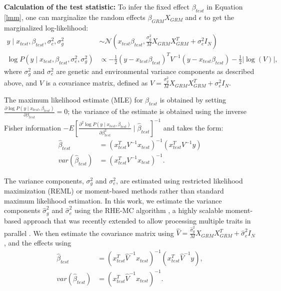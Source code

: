 \textbf{Calculation of the test statistic: }
%
To infer the fixed effect $\beta_{test}$ in Equation \ref{lmm}, one can marginalize the random effects $\beta_{GRM}X_{GRM}$ and $\epsilon$ to get the marginalized log-likelihood:
\begin{align}
    y \mid x_{test}, \beta_{test}, \sigma_e^2, \sigma_g^2 &\sim \mathcal{N}(x_{test}\beta_{test}, \frac{\sigma_g^2}{M} X_{GRM}X_{GRM}^T + \sigma_e^2 I_N) \nonumber \\
    \log P(y \mid x_{test}, \beta_{test}, \sigma_e^2, \sigma_g^2) &\propto -\frac{1}{2} (y-x_{test}\beta_{test})^TV^{-1}(y-x_{test}\beta_{test}) -\frac{1}{2} \lvert \log(V) \rvert,
\label{eq:full_like}
\end{align}
where $\sigma_g^2$ and $\sigma_e^2$ are genetic and environmental variance components as described above, and $V$ is a covariance matrix, defined as $V = \frac{\sigma_g^2}{M} X_{GRM}X_{GRM}^T + \sigma_e^2 I_N$.
%

The maximum likelihood estimate (MLE) for $\beta_{test}$ is obtained by setting $\frac{\partial \log P(y \mid x_{test}, \beta_{test})}{\partial \beta_{test}} = 0$; the variance of the estimate is obtained using the inverse Fisher information $ -\mathbf{}{E}\left[\frac{\partial ^2 \log P(y \mid x_{test}, \beta_{test})}{\partial \beta_{test}^2} \mid \hat{\beta}_{test}\right]^{-1}$ and takes the form:
\begin{align}
    \hat{\beta}_{test} &= (x_{test}^T V^{-1} x_{test})^{-1}(x_{test}^T V^{-1} y) \nonumber \\
    var(\hat{\beta}_{test}) &=(x_{test}^T V^{-1} x_{test})^{-1} \label{lmm-inf}.
\end{align}

%
The variance components, $\sigma_g^2$ and $\sigma_e^2$, are estimated using restricted likelihood maximization (REML) \cite{loh2015efficient} or moment-based methods \cite{wu2018scalable,pazokitoroudi2020efficient} rather than standard maximum likelihood estimation.
%
In this work, we estimate the variance components $\hat{\sigma}_g^2$ and $\hat{\sigma}_e^2$ using the RHE-MC algorithm \cite{wu2018scalable,pazokitoroudi2020efficient}, a highly scalable moment-based approach that was recently extended to allow processing multiple traits in parallel \cite{zhu2024ARGRHE}.
%
We then estimate the covariance matrix using $\hat{V} = \frac{\hat{\sigma}_g^2}{M} X_{GRM}X_{GRM}^T + \hat{\sigma}_e^2 I_N$, and the effects using
\begin{align}
    \hat{\beta}_{test} &= (x_{test}^T \hat{V}^{-1} x_{test})^{-1}(x_{test}^T \hat{V}^{-1} y), \nonumber \\
    var(\hat{\beta}_{test}) &= (x_{test}^T \hat{V}^{-1} x_{test})^{-1} \label{lmm-inf2}.
\end{align}

